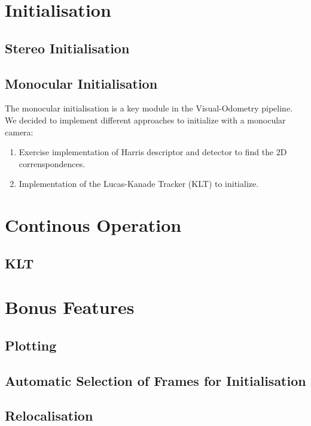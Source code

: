 \section{Initialisation}
\label{s:Initialisation}

\subsection{Stereo Initialisation}

\subsection{Monocular Initialisation}
The monocular initialisation is a key module in the Visual-Odometry pipeline.
We decided to implement different approaches to initialize with a monocular camera:

\begin{enumerate}
\item Exercise implementation of Harris descriptor and detector to find the 2D correnspondences.
\item Implementation of the Lucas-Kanade Tracker (KLT) to initialize.
\end{enumerate}

\section{Continous Operation}
\label{s:ContOp}

\subsection{KLT}

\section{Bonus Features}
\label{s:BF}

\subsection{Plotting}

\subsection{Automatic Selection of Frames for Initialisation}

\subsection{Relocalisation}

